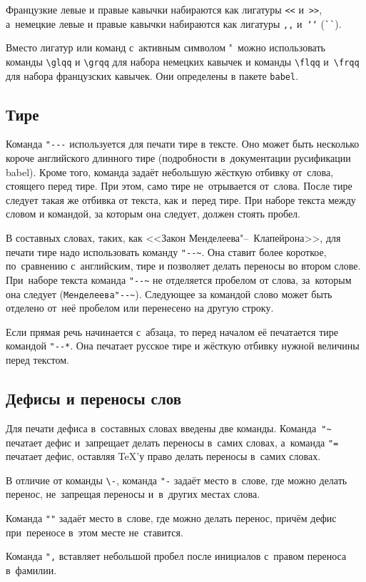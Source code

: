 Французкие левые и правые кавычки набираются
как лигатуры \verb|<<| и~\verb|>>|, а~немецкие левые
и правые кавычки набираются как лигатуры \verb|,,| и~\verb|‘‘| (\verb|``|).

Вместо лигатур или команд с~активным символом "\ можно использовать команды
\verb|\glqq| и \verb|\grqq| для набора немецких кавычек и команды \verb|\flqq|
и~\verb|\frqq| для набора французских кавычек. Они определены в пакете
\verb|babel|.

\subsection{Тире}
Команда \verb|"---| используется для печати тире в тексте. Оно может быть
несколько короче английского длинного тире (подробности в~документации
русификации babel). Кроме того, команда задаёт небольшую жёсткую отбивку
от~слова, стоящего перед тире. При этом, само тире не~отрывается от~слова.
После тире следует такая же отбивка от текста, как и~перед тире. При наборе
текста между словом и командой, за которым она следует, должен стоять пробел.

В составных словах, таких, как <<Закон Менделеева"--~Клапейрона>>, для печати
тире надо использовать команду \verb|"--~|. Она ставит более короткое,
по~сравнению с~английским, тире и позволяет делать переносы во втором слове.
При~наборе текста команда \verb|"--~| не отделяется пробелом от слова,
за~которым она следует (\verb|Менделеева"--~|). Следующее за командой слово
может быть  отделено от~неё пробелом или перенесено на другую строку.

Если прямая речь начинается с~абзаца, то перед началом её печатается тире
командой \verb|"--*|. Она печатает русское тире и жёсткую отбивку нужной
величины перед текстом.

\subsection{Дефисы и переносы слов}
Для печати дефиса в~составных словах введены две команды. Команда~\verb|"~|
печатает дефис и~запрещает делать переносы в~самих словах, а~команда \verb|"=|
печатает дефис, оставляя \TeX ’у право делать переносы в~самих словах.

В отличие от команды \verb|\-|, команда \verb|"-| задаёт место в~слове, где
можно делать перенос, не~запрещая переносы и~в~других местах слова.

Команда \verb|""| задаёт место в~слове, где можно делать перенос, причём дефис
при~переносе в~этом месте не~ставится.

Команда \verb|",| вставляет небольшой пробел после инициалов с~правом переноса
в~фамилии.

\FloatBarrier

